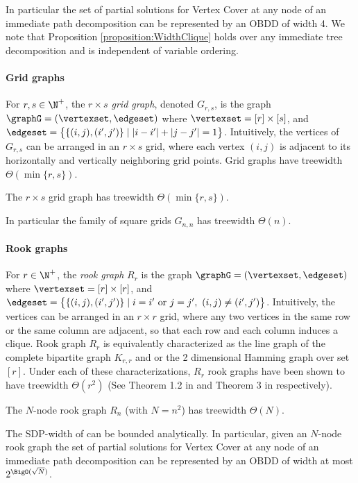 In particular the set of partial solutions for {\sc Vertex Cover} at any node of an immediate path decomposition can be represented by an OBDD of width 4. We note that Proposition \ref{proposition:WidthClique} holds over any immediate tree decomposition and is independent of variable ordering.

 
\paragraph*{Grid graphs}
For $r,s \in \N^+$, the \emph{$r \times s$ grid graph}, denoted $G_{r,s}$, is the graph $\graphG = (\vertexset,\edgeset)$ where $\vertexset = [r] \times [s]$, and $\edgeset = \bigl\{\{(i,j),(i',j')\} \mid |i-i'| + |j-j'| = 1 \bigr\}$. Intuitively, the vertices of $G_{r,s}$ can be arranged in an $r \times s$ grid, where each vertex $(i,j)$ is adjacent to its horizontally and vertically
neighboring grid points. Grid graphs have treewidth $\Theta(\min\{r,s\})$. 

\begin{observation}[Folklore]
    The $r \times s$ grid graph has treewidth $\Theta(\min\{r,s\})$.
\end{observation}
In particular the family of square grids $G_{n,n}$ has treewidth $\Theta(n)$.


\paragraph*{Rook graphs}
For $r \in \N^+$, the \emph{rook graph} $R_r$ is the graph
$\graphG = (\vertexset,\edgeset)$ where $\vertexset = [r] \times [r]$, and $\edgeset = \bigl\{\{(i,j),(i',j')\} \mid i=i' \text{ or } j=j',\ (i,j) \neq (i',j') \bigr\}$.
Intuitively, the vertices can be arranged in an $r \times r$ grid, where any two vertices in the same row or the same column are adjacent, so that each row and each column induces a clique. Rook graph $R_r$ is equivalently characterized as the line graph of the complete bipartite graph $K_{r,r}$ and or the 2 dimensional Hamming graph over set  $[r]$. Under each of these characterizations, $R_r$ rook graphs have been shown to have treewidth $\Theta(r^2)$ (See Theorem 1.2 in \cite{HarveyTreewidth2014} and Theorem 3 in \cite{SUNILCHANDRAN} respectively).

\begin{observation}
    The $N$-node rook graph $R_n$ (with $N = n^2$) has treewidth $\Theta(N)$.
\end{observation}

The SDP-width of can be bounded analytically. In particular, given an $N$-node rook graph the set of partial solutions for {\sc Vertex Cover} at any node of an immediate path decomposition can be represented by an OBDD of width at most $2^{\BigO(\sqrt{N})}$.

